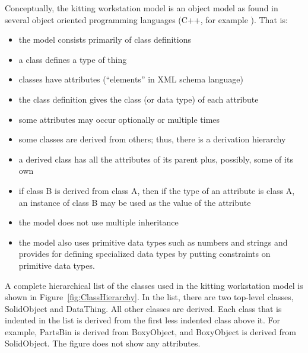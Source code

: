 Conceptually, the kitting workstation model is an object model as found in
several object oriented programming languages (C++, for example
\cite{Stroustrup.2000}).  That is:
\begin{itemize}
\item the model consists primarily of class definitions
\item a class defines a type of thing
\item classes have attributes (``elements'' in XML schema language)
\item the class definition gives the class (or data type) of each attribute
\item some attributes may occur optionally or multiple times
\item some classes are derived from others; thus, there is a derivation
 hierarchy 
\item a derived class has all the attributes of its parent plus, possibly,
  some of its own
\item if class B is derived from class A, then if the type of an attribute
  is class A, an instance of class B may be used as the value of the attribute
\item the model does not use multiple inheritance
\item the model also uses primitive data types such as numbers and strings
  and provides for defining specialized data types by putting constraints
  on primitive data types.
\end{itemize}

A complete hierarchical list of the classes used in the kitting workstation
model is shown in Figure~\ref{fig:ClassHierarchy}. In the list, there are two
top-level classes, SolidObject and DataThing. All other classes are
derived. Each class that is indented in the list is derived from the first
less indented class above it. For example, PartsBin is derived from
BoxyObject, and BoxyObject is derived from SolidObject. The figure does not
show any attributes.

